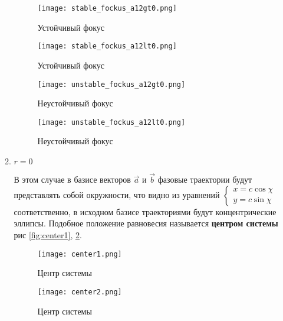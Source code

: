 \begin{enumerate}
\begin{enumerate}
    \begin{figure}[h!]
      \begin{center}
          \begin{minipage}[h!]{0.48\linewidth}
              \texttt{[image: stable\_fockus\_a12gt0.png]}
              \caption{Устойчивый фокус}
              \label{fig:stable_fockus_a12gt0}
          \end{minipage}
          \hfill
          \begin{minipage}[h!]{0.48\linewidth}
              \texttt{[image: stable\_fockus\_a12lt0.png]}
              \caption{Устойчивый фокус}
              \label{fig:stable_fockus_a12lt0}
          \end{minipage}
          \hfill
          \begin{minipage}[h!]{0.48\linewidth}
              \texttt{[image: unstable\_fockus\_a12gt0.png]}
              \caption{Неустойчивый фокус}
              \label{fig:unstable_fockus_a12gt0}
          \end{minipage}
          \hfill
          \begin{minipage}[h!]{0.48\linewidth}
              \texttt{[image: unstable\_fockus\_a12lt0.png]}
              \caption{Неустойчивый фокус}
              \label{fug:unstable_fockus_a12lt0}
          \end{minipage}
      \end{center}
  \end{figure}

  \item $r = 0$
  
  В этом случае в базисе векторов $\vec{a}$ и $\vec{b}$ фазовые траектории будут представлять собой окружности, что видно из уравнений 
  $
  \begin{cases}
    x = c \cos {\chi} \\
    y = c \sin {\chi}
  \end{cases}
  $ соответственно, в исходном базисе траекториями будут концентрические эллипсы. Подобное положение равновесия называется \textbf{центром системы} рис \ref{fig:center1}, \ref{fig:center2}.

  \begin{figure}[h!]
    \begin{center}
        \begin{minipage}[h!]{0.48\linewidth}
            \texttt{[image: center1.png]}
            \caption{Центр системы}
            \label{fig:center1}
        \end{minipage}
        \hfill
        \begin{minipage}[h!]{0.48\linewidth}
            \texttt{[image: center2.png]}
            \caption{Центр системы}
            \label{fig:center2}
        \end{minipage}
    \end{center}
  \end{figure}

  \end{enumerate}

\end{enumerate}

